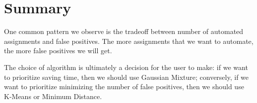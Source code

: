\section{Summary}

One common pattern we observe is the tradeoff between number of automated assignments and false positives. The more assignments that we want to automate, the more false positives we will get. 

The choice of algorithm is ultimately a decision for the user to make: if we want to prioritize saving time, then we should use Gaussian Mixture; conversely, if we want to prioritize minimizing the number of false positives, then we should use K-Means or Minimum Distance.